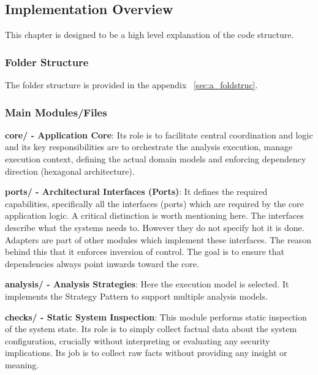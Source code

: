 \newpage

\subsection{Implementation Overview}

This chapter is designed to be a high level explanation of the code structure.

\subsubsection{Folder Structure}

The folder structure is provided in the appendix ~\ref{sec:a_foldstruc}.

\subsubsection{Main Modules/Files}

\textbf{core/ - Application Core}: Its role is to facilitate central coordination and logic and its key responsibilities are to orchestrate the analysis execution, manage execution context, defining the actual domain models  and enforcing dependency direction (hexagonal architecture).\newline

\textbf{ports/ - Architectural Interfaces (Ports)}: It defines the required capabilities, specifically  all the interfaces (ports) which are required by the core application logic. A critical distinction is worth mentioning here. The interfaces describe what the systems needs to. However they do not specify hot it is done. Adapters are part of other modules which implement these interfaces. The reason behind this that it enforces inversion of control. The goal is to ensure that  dependencies always point inwards toward the core.\newline

\textbf{analysis/ - Analysis Strategies}: Here the execution model is selected. It implements the Strategy Pattern to support multiple analysis models. \newline

\textbf{checks/ - Static System Inspection}: This module performs static inspection of the system state. Its role is to simply collect factual data about the system configuration, crucially without interpreting or evaluating any security implications. Its job is to collect raw facts without providing any insight or meaning.\newline

